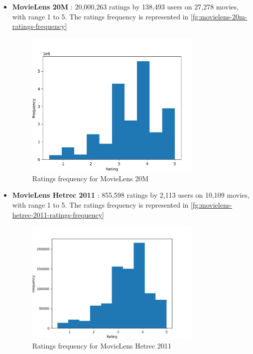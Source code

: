 \begin{itemize}
\item \textbf{MovieLens 20M} \cite{movielens-20m-dataset}: 20,000,263 ratings by 138,493 users on 27,278 movies, with range 1 to 5. The ratings frequency is represented in \autoref{fg:movielens-20m-ratings-frequency}
\begin{figure}[htb]
\centering
\includegraphics[width=0.8\textwidth]{pictures/movielens-20m-ratings-frequency}
\caption{Ratings frequency for MovieLens 20M}
\label{fg:movielens-20m-ratings-frequency}
\end{figure}
\item \textbf{MovieLens Hetrec 2011} \cite{grouplens, hetrec-2011}: 855,598 ratings by 2,113 users on 10,109 movies, with range 1 to 5. The ratings frequency is represented in \autoref{fg:movielens-hetrec-2011-ratings-frequency}
\begin{figure}[htb]
\centering
\includegraphics[width=0.8\textwidth]{pictures/movielens-hetrec-2011-ratings-frequency}
\caption{Ratings frequency for MovieLens Hetrec 2011}

\end{figure}
\end{itemize}
